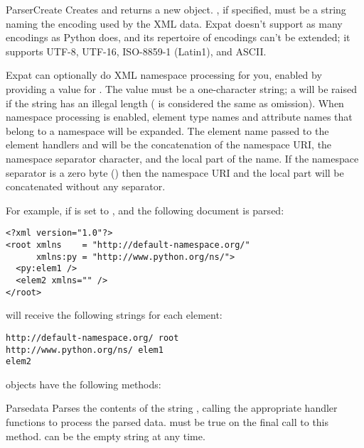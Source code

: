 \begin{funcdesc}{ParserCreate}{}
Creates and returns a new  object.  
, if specified, must be a string naming the encoding 
used by the XML data.  Expat doesn't support as many encodings as
Python does, and its repertoire of encodings can't be extended; it
supports UTF-8, UTF-16, ISO-8859-1 (Latin1), and ASCII.  

Expat can optionally do XML namespace processing for you, enabled by
providing a value for .  The value must be a
one-character string; a  will be raised if the
string has an illegal length ( is considered the same as
omission).  When namespace processing is enabled, element type names
and attribute names that belong to a namespace will be expanded.  The
element name passed to the element handlers
 and 
will be the concatenation of the namespace URI, the namespace
separator character, and the local part of the name.  If the namespace
separator is a zero byte () then the namespace URI and
the local part will be concatenated without any separator. 

For example, if  is set to 
\character{ }, and the following document is parsed:

\begin{verbatim}
<?xml version="1.0"?>
<root xmlns    = "http://default-namespace.org/"
      xmlns:py = "http://www.python.org/ns/">
  <py:elem1 />
  <elem2 xmlns="" />
</root>
\end{verbatim}

 will receive the following strings
for each element:

\begin{verbatim}
http://default-namespace.org/ root
http://www.python.org/ns/ elem1
elem2
\end{verbatim}

\end{funcdesc}

 objects have the following methods:

\begin{methoddesc}[xmlparser]{Parse}{data }
Parses the contents of the string , calling the appropriate
handler functions to process the parsed data.   must be
true on the final call to this method.     can be the empty
string at any time.
\end{methoddesc}


